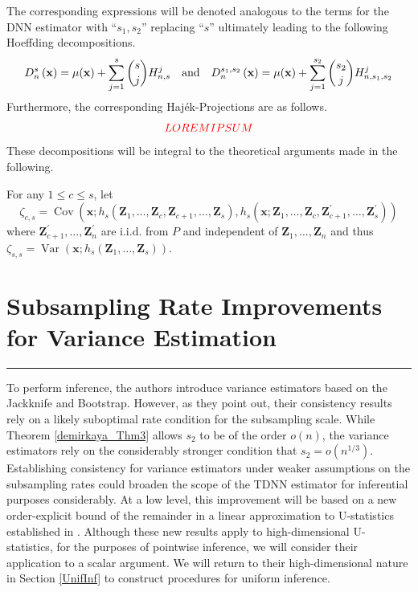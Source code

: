 \documentclass[letterpaper,10pt]{article}
\numberwithin{equation}{section}
\numberwithin{theorem}{section}
\numberwithin{remark}{section}
\numberwithin{example}{section}
\theoremstyle{definition}
\newcommand{\1}{\mathbb{1}}
\begin{document}
The corresponding expressions will be denoted analogous to the terms for the DNN estimator with ``$s_1, s_2$'' replacing ``$s$'' ultimately leading to the following Hoeffding decompositions.
\begin{equation}
	D_n^s\left(\mathbf{x}\right)
	= \mu(\mathbf{x}) + \sum_{j = 1}^{s}\binom{s}{j}H_{n,s}^{j}\\
	\quad \text{and} \quad
	D_n^{s_1,s_2}\left(\mathbf{x}\right)
	= \mu(\mathbf{x}) + \sum_{j = 1}^{s_2}\binom{s_2}{j}H_{n,s_1, s_2}^{j}
\end{equation}
Furthermore, the corresponding Haj\'ek-Projections are as follows.
\begin{equation}
	{\color{red} LOREM IPSUM}
\end{equation}
These decompositions will be integral to the theoretical arguments made in the following.

For any $1 \leq c \leq s$, let
\begin{equation}
	\zeta_{c,s}
	= \operatorname{Cov}\left(\mathbf{x}; h_s\left(\mathbf{Z}_1, \ldots, \mathbf{Z}_c, \mathbf{Z}_{c+1}, \ldots, \mathbf{Z}_s\right),
	h_s\left(\mathbf{x}; \mathbf{Z}_1, \ldots, \mathbf{Z}_c, \mathbf{Z}_{c+1}^{\prime}, \ldots, \mathbf{Z}_s^{\prime}\right)\right)
\end{equation}
where $\mathbf{Z}_{c+1}^{\prime}, \ldots, \mathbf{Z}_n^{\prime}$ are i.i.d. from $P$ and independent of $\mathbf{Z}_1, \ldots, \mathbf{Z}_n$ and thus
$\zeta_{s,s} = \operatorname{Var}\left(\mathbf{x}; h_s\left(\mathbf{Z}_1, \ldots, \mathbf{Z}_s\right)\right).$


\newpage
\section{Subsampling Rate Improvements for Variance Estimation}\label{Subsampling_Improvements}
\hrule
To perform inference, the authors introduce variance estimators based on the Jackknife and Bootstrap.
However, as they point out, their consistency results rely on a likely suboptimal rate condition for the subsampling scale.
While Theorem \ref{demirkaya_Thm3} allows $s_2$ to be of the order $o(n)$, the variance estimators rely on the considerably stronger condition that $s_2 = o(n^{1/3})$.
Establishing consistency for variance estimators under weaker assumptions on the subsampling rates could broaden the scope of the TDNN estimator for inferential purposes considerably.
At a low level, this improvement will be based on a new order-explicit bound of the remainder in a linear approximation to U-statistics established in \citet{ritzwoller_uniform_2024}.
Although these new results apply to high-dimensional U-statistics, for the purposes of pointwise inference, we will consider their application to a scalar argument.
We will return to their high-dimensional nature in Section \ref{UnifInf} to construct procedures for uniform inference.
\end{document}
